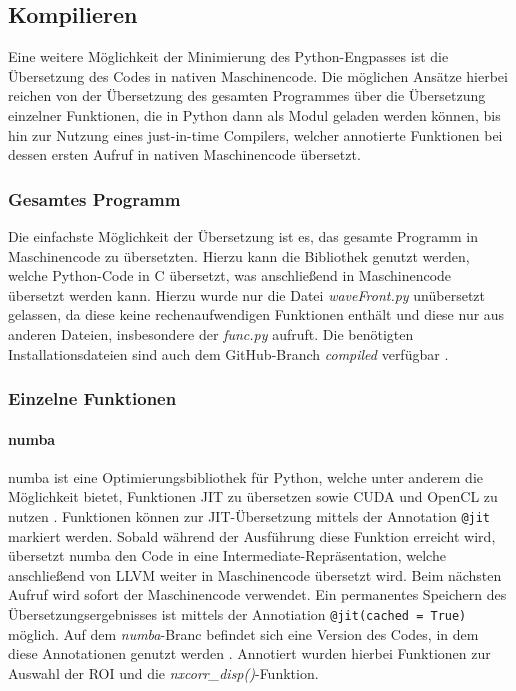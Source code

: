 \subsection{Kompilieren}

Eine weitere Möglichkeit der Minimierung des Python-Engpasses ist die Übersetzung des Codes in nativen Maschinencode. Die möglichen Ansätze hierbei reichen von der Übersetzung des gesamten Programmes über die Übersetzung einzelner Funktionen, die in Python dann als Modul geladen werden können, bis hin zur Nutzung eines just-in-time Compilers, welcher annotierte Funktionen bei dessen ersten Aufruf in nativen Maschinencode übersetzt. 

\subsubsection{Gesamtes Programm}

Die einfachste Möglichkeit der Übersetzung ist es, das gesamte Programm in Maschinencode zu übersetzten. Hierzu kann die Bibliothek \cite{BBD+17} genutzt werden, welche Python-Code in C übersetzt, was anschließend in Maschinencode übersetzt werden kann. Hierzu wurde nur die Datei \textit{waveFront.py} unübersetzt gelassen, da diese keine rechenaufwendigen Funktionen enthält und diese nur aus anderen Dateien, insbesondere der \textit{func.py} aufruft. Die benötigten Installationsdateien sind auch dem GitHub-Branch \textit{compiled} verfügbar \cite{Coj17}. 

\subsubsection{Einzelne Funktionen}

\paragraph{numba}

numba ist eine Optimierungsbibliothek für Python, welche unter anderem die Möglichkeit bietet, Funktionen \gls{JIT} zu übersetzen sowie CUDA und OpenCL zu nutzen \cite{LPS15}. Funktionen können zur \gls{JIT}-Übersetzung mittels der Annotation \texttt{@jit} markiert werden. Sobald während der Ausführung diese Funktion erreicht wird, übersetzt numba den Code in eine Intermediate-Repräsentation, welche anschließend von LLVM weiter in Maschinencode übersetzt wird. Beim nächsten Aufruf wird sofort der Maschinencode verwendet. Ein permanentes Speichern des Übersetzungsergebnisses ist mittels der Annotiation \texttt{@jit(cached = True)} möglich. Auf dem \textit{numba}-Branc befindet sich eine Version des Codes, in dem diese Annotationen genutzt werden \cite{Coj17}. Annotiert wurden hierbei Funktionen zur Auswahl der \gls{ROI} und die \textit{nxcorr\_disp()}-Funktion.

